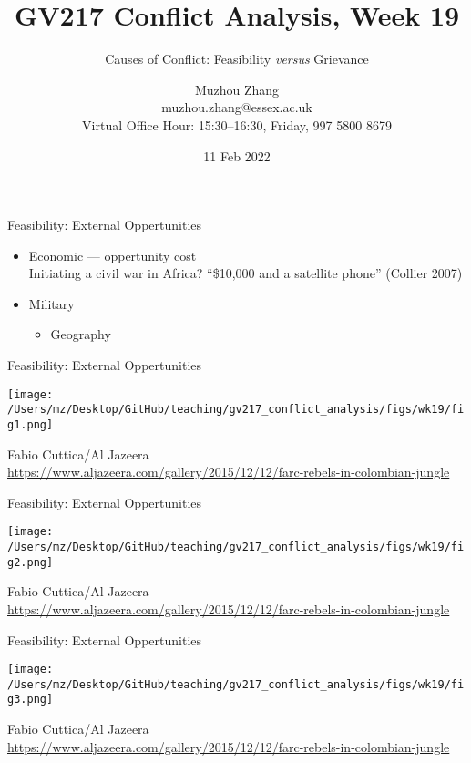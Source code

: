 \documentclass[handout]{beamer}
\title{GV217 Conflict Analysis, Week 19}
\subtitle{Causes of Conflict: Feasibility \emph{versus} Grievance}
\author{Muzhou Zhang\\ muzhou.zhang@essex.ac.uk\\ Virtual Office Hour: 15:30--16:30, Friday, 997 5800 8679}
\date{11 Feb 2022}
\begin{document}
\maketitle
{}

\begin{frame}{Feasibility: External Oppertunities}
    \begin{itemize}
        \pause\item Economic --- oppertunity cost\\
        \pause      Initiating a civil war in Africa? ``\$10,000 and a satellite phone'' (Collier 2007)
        \pause\item Military
        \begin{itemize}
            \pause\item Geography
        \end{itemize}
    \end{itemize}
\end{frame}

\begin{frame}{Feasibility: External Oppertunities}
    \begin{center}
        \texttt{[image: /Users/mz/Desktop/GitHub/teaching/gv217\_conflict\_analysis/figs/wk19/fig1.png]}
    \end{center}
    \tiny Fabio Cuttica/Al Jazeera\\ \url{https://www.aljazeera.com/gallery/2015/12/12/farc-rebels-in-colombian-jungle}
\end{frame}

\begin{frame}{Feasibility: External Oppertunities}
    \begin{center}
        \texttt{[image: /Users/mz/Desktop/GitHub/teaching/gv217\_conflict\_analysis/figs/wk19/fig2.png]}
    \end{center}
    \tiny Fabio Cuttica/Al Jazeera\\ \url{https://www.aljazeera.com/gallery/2015/12/12/farc-rebels-in-colombian-jungle}
\end{frame}

\begin{frame}{Feasibility: External Oppertunities}
    \begin{center}
        \texttt{[image: /Users/mz/Desktop/GitHub/teaching/gv217\_conflict\_analysis/figs/wk19/fig3.png]}
    \end{center}
    \tiny Fabio Cuttica/Al Jazeera\\ \url{https://www.aljazeera.com/gallery/2015/12/12/farc-rebels-in-colombian-jungle}
\end{frame}
\end{document}
